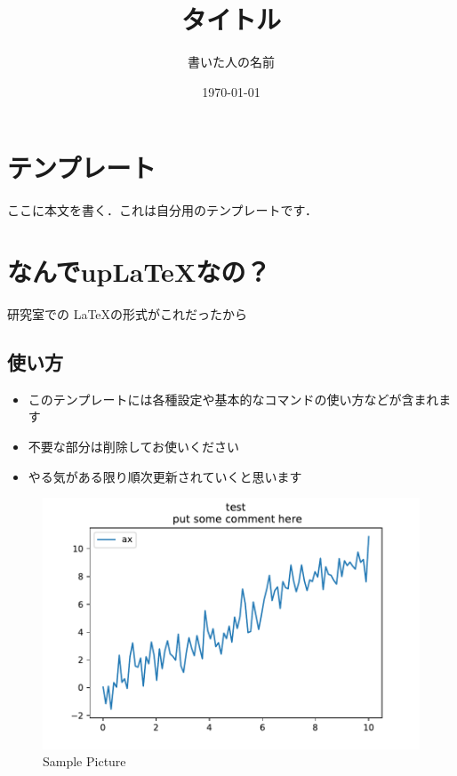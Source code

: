 \documentclass[uplatex, a4paper]{jsarticle}
\title{\Huge タイトル}
\author{\huge 書いた人の名前}
\date{\today}
\begin{document}
\maketitle  %

\section{テンプレート}
ここに本文を書く．これは自分用のテンプレートです．

\section{なんでupLaTeXなの？}
研究室での \LaTeX の形式がこれだったから

\subsection{使い方}
\begin{itemize}
    \item このテンプレートには各種設定や基本的なコマンドの使い方などが含まれます
    \item 不要な部分は削除してお使いください
    \item やる気がある限り順次更新されていくと思います
\end{itemize}

\begin{figure}[h]   %
    \centering              %
    \includegraphics[width=60truemm,clip]{Images/graph_sample.pdf}
    \caption{Sample Picture}%
    \label{fig:sample}      %
\end{figure}
\end{document}
